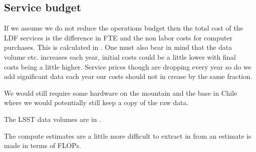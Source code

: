 \subsection{Service budget}

If we assume we do not reduce the operations budget then the total cost of the \gls{LDF} services is
the difference in \gls{FTE} and the non labor costs for computer purchases.
This is calculated in . One must also bear in mind that the data volume etc. increases each year,
initial costs could be a little lower with final costs being a little higher. Service prices though are dropping every year so do we add significant data each year our costs should not in crease by the same fraction.




We would still require some hardware on the mountain and the base in Chile where we would potentially still keep a copy of the raw data.

The  \gls{LSST} data volumes are in  .





The compute estimates are a little more difficult to extract in  from 
an estimate is made in terms of FLOPs.


